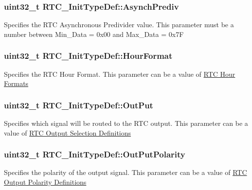 \subsubsection[{\texorpdfstring{Asynch\+Prediv}{AsynchPrediv}}]{\setlength{\rightskip}{0pt plus 5cm}uint32\+\_\+t R\+T\+C\+\_\+\+Init\+Type\+Def\+::\+Asynch\+Prediv}\hypertarget{struct_r_t_c___init_type_def_a8666a1fe64fe25f9b951219561a07a95}{}\label{struct_r_t_c___init_type_def_a8666a1fe64fe25f9b951219561a07a95}
Specifies the R\+TC Asynchronous Predivider value. This parameter must be a number between Min\+\_\+\+Data = 0x00 and Max\+\_\+\+Data = 0x7F 
\subsubsection[{\texorpdfstring{Hour\+Format}{HourFormat}}]{\setlength{\rightskip}{0pt plus 5cm}uint32\+\_\+t R\+T\+C\+\_\+\+Init\+Type\+Def\+::\+Hour\+Format}\hypertarget{struct_r_t_c___init_type_def_aa7dff3583cd79a5a3f9868a56ffd31ee}{}\label{struct_r_t_c___init_type_def_aa7dff3583cd79a5a3f9868a56ffd31ee}
Specifies the R\+TC Hour Format. This parameter can be a value of \hyperlink{group___r_t_c___hour___formats}{R\+TC Hour Formats} 
\subsubsection[{\texorpdfstring{Out\+Put}{OutPut}}]{\setlength{\rightskip}{0pt plus 5cm}uint32\+\_\+t R\+T\+C\+\_\+\+Init\+Type\+Def\+::\+Out\+Put}\hypertarget{struct_r_t_c___init_type_def_acd1593d55123feca6c3cae142134c294}{}\label{struct_r_t_c___init_type_def_acd1593d55123feca6c3cae142134c294}
Specifies which signal will be routed to the R\+TC output. This parameter can be a value of \hyperlink{group___r_t_c___output__selection___definitions}{R\+TC Output Selection Definitions} 
\subsubsection[{\texorpdfstring{Out\+Put\+Polarity}{OutPutPolarity}}]{\setlength{\rightskip}{0pt plus 5cm}uint32\+\_\+t R\+T\+C\+\_\+\+Init\+Type\+Def\+::\+Out\+Put\+Polarity}\hypertarget{struct_r_t_c___init_type_def_a14365da1f80863621341cf4a6a8d4e67}{}\label{struct_r_t_c___init_type_def_a14365da1f80863621341cf4a6a8d4e67}
Specifies the polarity of the output signal. This parameter can be a value of \hyperlink{group___r_t_c___output___polarity___definitions}{R\+TC Output Polarity Definitions} 
